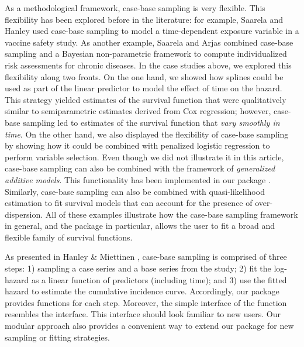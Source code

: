 \documentclass[
]{jss}
\begin{document}
As a methodological framework, case-base sampling is very flexible. This
flexibility has been explored before in the literature: for example,
Saarela and Hanley \citeyearpar{saarela2015case} used case-base sampling
to model a time-dependent exposure variable in a vaccine safety study.
As another example, Saarela and Arjas \citeyearpar{saarela2015non}
combined case-base sampling and a Bayesian non-parametric framework to
compute individualized risk assessments for chronic diseases. In the
case studies above, we explored this flexibility along two fronts. On
the one hand, we showed how splines could be used as part of the linear
predictor to model the effect of time on the hazard. This strategy
yielded estimates of the survival function that were qualitatively
similar to semiparametric estimates derived from Cox regression;
however, case-base sampling led to estimates of the survival function
that \emph{vary smoothly in time}. On the other hand, we also displayed
the flexibility of case-base sampling by showing how it could be
combined with penalized logistic regression to perform variable
selection. Even though we did not illustrate it in this article,
case-base sampling can also be combined with the framework of
\emph{generalized additive models}. This functionality has been
implemented in our package . Similarly, case-base sampling
can also be combined with quasi-likelihood estimation to fit survival
models that can account for the presence of over-dispersion. All of
these examples illustrate how the case-base sampling framework in
general, and the package  in particular, allows the user
to fit a broad and flexible family of survival functions.

As presented in Hanley \& Miettinen \citeyearpar{hanley2009fitting},
case-base sampling is comprised of three steps: 1) sampling a case
series and a base series from the study; 2) fit the log-hazard as a
linear function of predictors (including time); and 3) use the fitted
hazard to estimate the cumulative incidence curve. Accordingly, our
package provides functions for each step. Moreover, the simple interface
of the  function resembles the 
interface. This interface should look familiar to new users. Our modular
approach also provides a convenient way to extend our package for new
sampling or fitting strategies.
\end{document}
